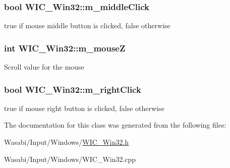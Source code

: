 \subsubsection[{\texorpdfstring{m\+\_\+middle\+Click}{m_middleClick}}]{\setlength{\rightskip}{0pt plus 5cm}bool W\+I\+C\+\_\+\+Win32\+::m\+\_\+middle\+Click\hspace{0.3cm}{\ttfamily [protected]}}\hypertarget{class_w_i_c___win32_a0f7ff5339ac45c9a67c67fc6d5d5e544}{}\label{class_w_i_c___win32_a0f7ff5339ac45c9a67c67fc6d5d5e544}
true if mouse middle button is clicked, false otherwise 
\subsubsection[{\texorpdfstring{m\+\_\+mouseZ}{m_mouseZ}}]{\setlength{\rightskip}{0pt plus 5cm}int W\+I\+C\+\_\+\+Win32\+::m\+\_\+mouseZ\hspace{0.3cm}{\ttfamily [protected]}}\hypertarget{class_w_i_c___win32_ac03dc4e6a2718caff6007fcbf35fe3ab}{}\label{class_w_i_c___win32_ac03dc4e6a2718caff6007fcbf35fe3ab}
Scroll value for the mouse 
\subsubsection[{\texorpdfstring{m\+\_\+right\+Click}{m_rightClick}}]{\setlength{\rightskip}{0pt plus 5cm}bool W\+I\+C\+\_\+\+Win32\+::m\+\_\+right\+Click\hspace{0.3cm}{\ttfamily [protected]}}\hypertarget{class_w_i_c___win32_a92e3904726f4b216c33c2dcb1e441988}{}\label{class_w_i_c___win32_a92e3904726f4b216c33c2dcb1e441988}
true if mouse right button is clicked, false otherwise 

The documentation for this class was generated from the following files\+:\begin{DoxyCompactItemize}
\item 
Wasabi/\+Input/\+Windows/\hyperlink{_w_i_c___win32_8h}{W\+I\+C\+\_\+\+Win32.\+h}\item 
Wasabi/\+Input/\+Windows/W\+I\+C\+\_\+\+Win32.\+cpp\end{DoxyCompactItemize}

